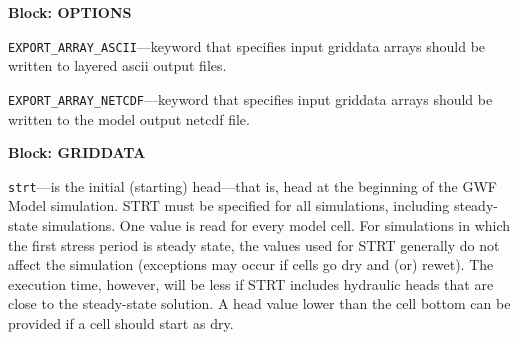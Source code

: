 
\item \textbf{Block: OPTIONS}

\begin{description}
\item \texttt{EXPORT\_ARRAY\_ASCII}---keyword that specifies input griddata arrays should be written to layered ascii output files.

\item \texttt{EXPORT\_ARRAY\_NETCDF}---keyword that specifies input griddata arrays should be written to the model output netcdf file.

\end{description}
\item \textbf{Block: GRIDDATA}

\begin{description}
\item \texttt{strt}---is the initial (starting) head---that is, head at the beginning of the GWF Model simulation.  STRT must be specified for all simulations, including steady-state simulations. One value is read for every model cell. For simulations in which the first stress period is steady state, the values used for STRT generally do not affect the simulation (exceptions may occur if cells go dry and (or) rewet). The execution time, however, will be less if STRT includes hydraulic heads that are close to the steady-state solution.  A head value lower than the cell bottom can be provided if a cell should start as dry.

\end{description}

